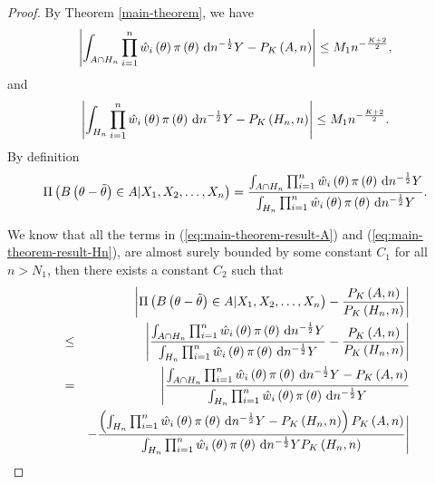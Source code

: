 \begin{thm}
\begin{proof}
By Theorem \ref{main-theorem}, we have 
\begin{equation}
\left|\int_{A\cap H_{n}}\prod_{i=1}^{n}\hat{w}_{i}\left(\theta\right)\pi\left(\theta\right)\,\mathrm{d} n^{-\frac{1}{2}}Y-P_{K}\left(A,n\right)\right|\le M_{1}n^{-\frac{K+2}{2}},\label{eq:main-theorem-result-A}
\end{equation}
and 
\begin{equation}
\left|\int_{H_{n}}\prod_{i=1}^{n}\hat{w}_{i}\left(\theta\right)\pi\left(\theta\right)\,\mathrm{d} n^{-\frac{1}{2}}Y-P_{K}\left(H_{n},n\right)\right|\le M_{1}n^{-\frac{K+2}{2}}.\label{eq:main-theorem-result-Hn}
\end{equation}
By definition 
\[
\Pi\left(B\left(\theta-\tilde{\theta}\right)\in A|X_{1},X_{2},\ldots,X_{n}\right)=\frac{\int_{A\cap H_{n}}\prod_{i=1}^{n}\hat{w}_{i}\left(\theta\right)\pi\left(\theta\right)\,\mathrm{d} n^{-\frac{1}{2}}Y}{\int_{H_{n}}\prod_{i=1}^{n}\hat{w}_{i}\left(\theta\right)\pi\left(\theta\right)\,\mathrm{d} n^{-\frac{1}{2}}Y}.
\]
\begin{comment}
add more detail in bounded. bounded above and below.
\end{comment}
We know that all the terms in (\ref{eq:main-theorem-result-A}) and (\ref{eq:main-theorem-result-Hn}),
are almost surely bounded by some constant $C_{1}$ for all $n>N_{1}$,
then there exists a constant $C_2$ such that
\begin{eqnarray}
 &  & \left|\Pi\left(B\left(\theta-\tilde{\theta}\right)\in A|X_{1},X_{2},\ldots,X_{n}\right)-\frac{P_{K}\left(A,n\right)}{P_{K}\left(H_{n},n\right)}\right|\nonumber \\
 & \le & \left|\frac{\int_{A\cap H_{n}}\prod_{i=1}^{n}\hat{w}_{i}\left(\theta\right)\pi\left(\theta\right)\diff n^{-\frac{1}{2}}Y}{\int_{H_{n}}\prod_{i=1}^{n}\hat{w}_{i}\left(\theta\right)\pi\left(\theta\right)\diff n^{-\frac{1}{2}}Y}-\frac{P_{K}\left(A,n\right)}{P_{K}\left(H_{n},n\right)}\right|\nonumber \\
 & = & \Bigg|\frac{\int_{A\cap H_{n}}\prod_{i=1}^{n}\hat{w}_{i}\left(\theta\right)\pi\left(\theta\right)\diff n^{-\frac{1}{2}}Y-P_{K}\left(A,n\right)}{\int_{H_{n}}\prod_{i=1}^{n}\hat{w}_{i}\left(\theta\right)\pi\left(\theta\right)\diff n^{-\frac{1}{2}}Y}\nonumber \\
 &  & -\frac{\left(\int_{H_{n}}\prod_{i=1}^{n}\hat{w}_{i}\left(\theta\right)\pi\left(\theta\right)\diff n^{-\frac{1}{2}}Y-P_{K}\left(H_{n},n\right)\right)P_{K}\left(A,n\right)}{\int_{H_{n}}\prod_{i=1}^{n}\hat{w}_{i}\left(\theta\right)\pi\left(\theta\right)\diff n^{-\frac{1}{2}}YP_{K}\left(H_{n},n\right)}\Bigg|\nonumber \\

\end{eqnarray}
\end{proof}
\end{thm}
